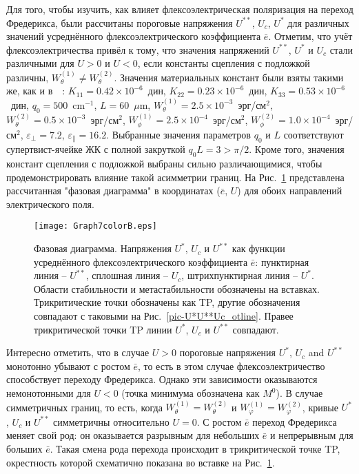 Для того, чтобы изучить, как влияет флексоэлектрическая поляризация на переход Фредерикса, были рассчитаны пороговые напряжения $U^{**}$, $U_c$, $U^{*}$ для различных значений усреднённого флексоэлектрического коэффициента $\bar{e}$.
Отметим, что учёт флексоэлектричества привёл к тому, что значения напряжений $U^{**}$, $U^*$ и $U_c$ стали различными для  $U>0$ и $U<0$, если константы сцепления с подложкой различны, $W_\theta^{(1)}\not=W_\theta^{(2)}$.
Значения материальных констант были взяты такими же, как и в~~\cite{VAR2013}: $K_{11}=0.42\times 10^{-6}$~дин, $K_{22}=0.23\times 10^{-6}$~дин, $K_{33}=0.53\times 10^{-6}$~дин,  $q_0=500$~$\text{cm}^{-1}$, $L=60$~$\mu\text{m}$, $W_\theta^{(1)}=2.5\times 10^{-3}$~эрг/см$^2$, $W_\theta^{(2)}=0.5\times 10^{-3}$~эрг/см$^2$,  $W_\phi^{(1)}=2.5\times 10^{-4}$~эрг/см$^2$, $W_\phi^{(2)}=1.0\times 10^{-4}$~эрг/см$^2$, $\varepsilon_\bot=7.2$, $\varepsilon_\|=16.2$.
Выбранные значения параметров $q_0$ и $L$ соответствуют супертвист-ячейке ЖК с полной закруткой $q_0L = 3>\pi/2$.
Кроме того, значения констант сцепления с подложкой выбраны сильно различающимися, чтобы продемонстрировать влияние такой асимметрии границ.
На Рис.~\ref{pic-U_from_e_pos} представлена рассчитанная "фазовая диаграмма" в координатах ($\bar{e}$, $U$) для обоих направлений электрического поля.
\begin{figure}%
	\centering
	\texttt{[image: Graph7colorB.eps]}
	\caption{Фазовая диаграмма.
		Напряжения $U^*$, $U_c$ и $U^{**}$ как функции усреднённого флексоэлектрического коэффициента $\bar{e}$: пунктирная линия -- $U^{**}$, сплошная линия -- $U_c$, штрихпунктирная линия -- $U^{*}$.
		Области стабильности и метастабильности обозначены на вставках.
		Трикритические точки обозначены как TP, другие обозначения совпадают с таковыми на Рис.~\ref{pic-U*U**Uc_otline}.
		Правее трикритической точки TP линии $U^*$, $U_c$ и $U^{**}$ совпадают.}
	\label{pic-U_from_e_pos}
\end{figure}
Интересно отметить, что в случае $U>0$ пороговые напряжения $U^*$, $U_c$ and $U^{**}$ монотонно убывают с ростом $\bar{e}$, то есть в этом случае флексоэлектричество способствует переходу Фредерикса.
Однако эти зависимости оказываются немонотонными для $U < 0$ (точка минимума обозначена как $M^0$).
В случае симметричных границ, то есть, когда $W^{(1)}_\theta = W^{(2)}_\theta$ и $W^{(1)}_\varphi = W^{(2)}_\varphi$, кривые $U^*$, $U_c$ и $U^{**}$ симметричны относительно $U = 0$.
С ростом $\bar{e}$ переход Фредерикса меняет свой род: он оказывается разрывным для небольших $\bar{e}$ и непрерывным для больших $\bar{e}$.
Такая смена рода перехода происходит в трикритической точке TP, окрестность которой схематично показана во вставке на Рис.~\ref{pic-U_from_e_pos}.

